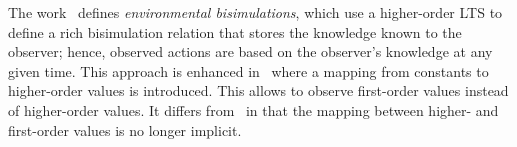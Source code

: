 %		



\noi 
The work~\cite{DBLP:conf/lics/SangiorgiKS07} defines \emph{environmental bisimulations},
which 
use a higher-order LTS 
to define a rich bisimulation relation that stores the knowledge known to
the observer; hence, observed actions are based on the observer's knowledge
at any given time. This approach is enhanced in~\cite{DBLP:journals/cl/KoutavasH12,DBLP:conf/esop/KoutavasH11}
where a mapping from constants to higher-order values is introduced. This 
allows to observe first-order values instead
of higher-order values. It differs from~\cite{San96H,JeffreyR05} in that 
the mapping between higher- and first-order values is no longer implicit.





